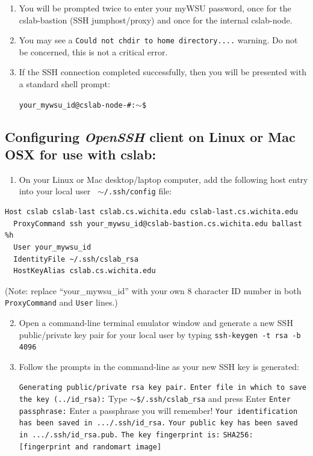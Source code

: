 \documentclass[12pt]{article}
\begin{document}
\begin{flushleft}
\begin{enumerate}
\item You will be prompted twice to enter your myWSU password, once for the cslab-bastion (SSH jumphost/proxy) and once for the internal cslab-node.
\item You may see a \texttt{Could not chdir to home directory....} warning. Do not be concerned, this is not a critical error.
\item If the SSH connection completed successfully, then you will be presented with a standard shell prompt:

\texttt{your\_mywsu\_id@cslab-node-\#:$\sim$\$}
\end{enumerate}

\subsection*{Configuring \textit{OpenSSH} client on Linux or Mac OSX for use with cslab:}
\begin{enumerate}
  \item On your Linux or Mac desktop/laptop computer, add the following host entry into your local user \texttt{ $\sim$/.ssh/config} file:
\end{enumerate}

\begin{verbatim}
Host cslab cslab-last cslab.cs.wichita.edu cslab-last.cs.wichita.edu
  ProxyCommand ssh your_mywsu_id@cslab-bastion.cs.wichita.edu ballast %h
  User your_mywsu_id
  IdentityFile ~/.ssh/cslab_rsa
  HostKeyAlias cslab.cs.wichita.edu
\end{verbatim}
(Note: replace ``your\_mywsu\_id'' with your own 8 character ID number in both \texttt{ProxyCommand} and \texttt{User} lines.)


\begin{enumerate}
  \setcounter{enumi}{1}
  \item Open a command-line terminal emulator window and generate a new SSH public/private key pair for your local user by typing \break
  \texttt{ssh-keygen -t rsa -b 4096}

  \item Follow the prompts in the command-line as your new SSH key is generated:
  
      \texttt{Generating public/private rsa key pair.} \break
      \texttt{Enter file in which to save the key (../id\_rsa):} \break
      Type \texttt{$\sim$\$/.ssh/cslab\_rsa} and press Enter \break
      \texttt{Enter passphrase:} Enter a passphrase you will remember! \break
      \texttt{Your identification has been saved in .../.ssh/id\_rsa.} \break
      \texttt{Your public key has been saved in .../.ssh/id\_rsa.pub.} \break
      \texttt{The key fingerprint is:} \break
      \texttt{SHA256: [fingerprint and randomart image]}
      

\end{enumerate}
\end{flushleft}
\end{document}
